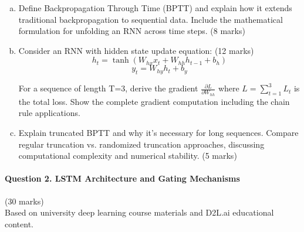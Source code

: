 \documentclass[12pt]{article}
\newcommand{\mediumanswer}{\vspace{3cm}}
\newcommand{\journalspace}{\vspace{4.5cm}}
\begin{document}
\begin{enumerate}[(a)]
    \item Define Backpropagation Through Time (BPTT) and explain how it extends traditional backpropagation to sequential data. Include the mathematical formulation for unfolding an RNN across time steps. \hfill (8 marks)
    
    \mediumanswer
    
    \item Consider an RNN with hidden state update equation: \hfill (12 marks)
    $$h_t = \tanh(W_{hx} x_t + W_{hh} h_{t-1} + b_h)$$
    $$y_t = W_{hy} h_t + b_y$$
    
    For a sequence of length T=3, derive the gradient $\frac{\partial L}{\partial W_{hh}}$ where $L = \sum_{t=1}^3 L_t$ is the total loss. Show the complete gradient computation including the chain rule applications.
    
    \journalspace
    
    \item Explain truncated BPTT and why it's necessary for long sequences. Compare regular truncation vs. randomized truncation approaches, discussing computational complexity and numerical stability. \hfill (5 marks)
    
    \mediumanswer
\end{enumerate}

\newpage
\paragraph{Question 2. LSTM Architecture and Gating Mechanisms}\hfill (30 marks)\\
Based on university deep learning course materials and D2L.ai educational content.
\end{document}
